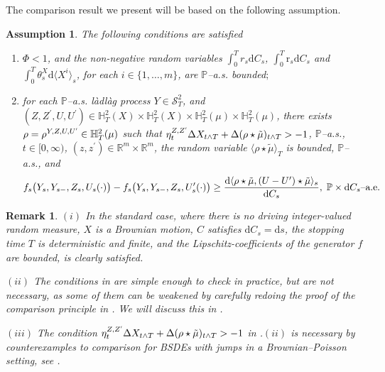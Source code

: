 \documentclass[10pt]{article} %
\newtheorem{assumption}[theorem]{Assumption}
\newtheorem{remark}[theorem]{Remark}
\newcommand\cS{\mathcal S}
\newcommand{\smalltext}[1]{\text{\fontsize{4}{4}\selectfont$#1$}}
\def \H{\mathbb{H}}
\def \P{\mathbb{P}}
\def \R{\mathbb{R}}
\def\d{\mathrm{d}}
\begin{document}
The comparison result we present will be based on the following assumption.

\begin{assumption}\label{ass::comparison}
	The following conditions are satisfied
	\begin{enumerate}
		\item[$(i)$] $\Phi < 1$, and the non-negative random variables $\int_0^T r_s \d C_s$, $\int_0^T \mathrm{r}_s \d C_s$ and $\int_0^T \theta^X_s \d \langle X^i\rangle_s$, for each $i \in \{1,\ldots,m\}$, are $\P$--{\rm a.s.} bounded$;$
		\item[$(ii)$] for each $\P$--{\rm a.s.} l\`adl\`ag process $Y \in \cS^2_T$,  and $(Z,Z^\prime,U,U^\prime) \in \H^2_T(X) \times \H^2_T(X) \times \H^2_T(\mu) \times \H^2_T(\mu)$, there exists $\rho = \rho^{Y,Z,U,U^\smalltext{\prime}} \in \H^2_T(\mu)$ such that $\eta^{Z,Z^\smalltext{\prime}}_t\Delta X_{t \land T} + \Delta (\rho \star \tilde\mu)_{t \land T} > -1$, $\P$--{\rm a.s.}, $t \in [0,\infty)$, $(z,z^\prime) \in \R^m \times \R^m$, the random variable $\langle \rho \star \tilde\mu\rangle_T$ is bounded, $\P$--{\rm a.s.}, and
			\begin{equation*}
				f_s\big(Y_s,Y_{s-},Z_s,U_s(\cdot)\big) - f_s\big(Y_s,Y_{s-},Z_s,U^\prime_s(\cdot)\big) 
				\geq \frac{\d\langle \rho \star\tilde\mu,(U-U^\prime)\star\tilde\mu\rangle_s}{\d C_s}, \; \text{$\P \times \d C_s$--{\rm a.e.}}
			\end{equation*}
	\end{enumerate}
\end{assumption}

\begin{remark}\label{rem::comparison_assumption}
$(i)$ In the standard case, where there is no driving integer-valued random measure, $X$ is a Brownian motion, $C$ satisfies $\d C_s = \d s$, the stopping time $T$ is deterministic and finite, and the Lipschitz-coefficients of the generator $f$ are bounded, {\rm{}} is clearly satisfied.

\medskip
$(ii)$ The conditions in {\rm{}} are simple enough to check in practice, but are not necessary, as some of them can be weakened by carefully redoing the proof of the comparison principle in {\rm{}}. We will discuss this in {\rm{}}.

\medskip
$(iii)$ The condition $\eta^{Z,Z^\smalltext{\prime}}_t\Delta X_{t \land T} + \Delta (\rho \star \tilde\mu)_{t \land T} > -1$ in {\rm{}.$(ii)$} is necessary by counterexamples to comparison for {\rm BSDEs} with jumps in a Brownian--Poisson setting, see {\rm\cite[Example 3.1]{quenez2013bsdes}}. 
\end{remark}
\end{document}
